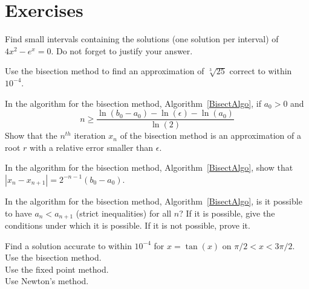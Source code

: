 

\section{Exercises}

\begin{question}
Find small intervals containing the solutions (one solution per
interval) of $4x^2 - e^x = 0$.  Do not forget to justify your answer.
\label{solvAQ1}
\end{question}

\begin{question}
Use the bisection method to find an approximation of $\sqrt[3]{25}$
correct to within $10^{-4}$.
\label{solvAQ2}
\end{question}

\begin{question}
In the algorithm for the bisection method, Algorithm~\ref{BisectAlgo},
if $a_0 >0$ and
\begin{equation}\label{first}
n \geq \frac{\ln(b_0-a_0)-\ln(\epsilon)-\ln(a_0)}{\ln(2)}
\end{equation}
Show that the $n^{th}$ iteration $x_n$ of the bisection method 
is an approximation of a root $r$ with a relative error smaller than
$\epsilon$.
\label{solvAQ3}
\end{question}

\begin{question}
In the algorithm for the bisection method, Algorithm~\ref{BisectAlgo},
show that $| x_n - x_{n+1}| = 2^{-n-1}(b_0 - a_0)$.
\label{solvAQ4}
\end{question}

\begin{question}
In the algorithm for the bisection method, Algorithm~\ref{BisectAlgo},
is it possible to have $a_n <a_{n+1}$ (strict inequalities) for all
$n$?  If it is possible, give the conditions under which it is
possible.  If it is not possible, prove it.
\label{solvAQ5}
\end{question}

\begin{question}
Find a solution accurate to within $10^{-4}$ for $x=\tan(x)$ on
$\pi/2 < x < 3 \pi/2$.\\
 Use the bisection method.\\
 Use the fixed point method.\\
 Use Newton's method.
\label{solvAQ6}
\end{question}


